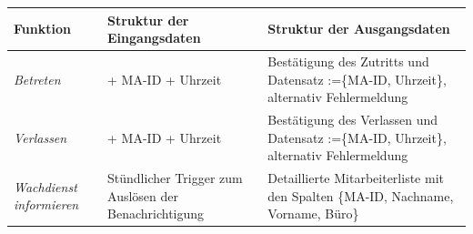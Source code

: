 {
\vspace{1cm}
\hspace{-2cm}
\footnotesize
\begin{tabular}{|p{3cm}|p{6cm}|p{6cm}|}
	\hline
		\textbf{Funktion	} &
		\textbf{Struktur der Eingangsdaten} &
		\textbf{Struktur der Ausgangsdaten} \\
	\hline \hline
		\textit{Betreten} &
		+ MA-ID \newline + Uhrzeit &
		Bestätigung des Zutritts und \newline Datensatz :=\{MA-ID, Uhrzeit\}, \newline alternativ Fehlermeldung \\
	\hline
		\textit{Verlassen} &
		+ MA-ID \newline + Uhrzeit &
		Bestätigung des Verlassen und \newline Datensatz :=\{MA-ID, Uhrzeit\}, \newline alternativ Fehlermeldung \\
	\hline
		\textit{Wachdienst \newline informieren} &
		Stündlicher Trigger zum Auslösen der Benachrichtigung&
		Detaillierte Mitarbeiterliste mit den Spalten \{MA-ID, Nachname, Vorname, Büro\} \\
	\hline
\end{tabular}
}

